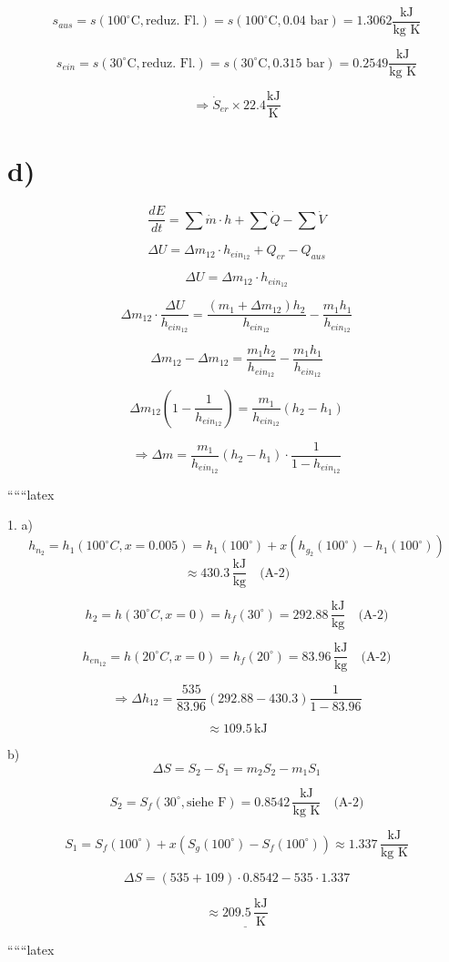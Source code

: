 \[
s_{aus} = s(100^\circ \text{C}, \text{reduz. Fl.}) = s(100^\circ \text{C}, 0.04 \text{ bar}) = 1.3062 \frac{\text{kJ}}{\text{kg K}}
\]

\[
s_{ein} = s(30^\circ \text{C}, \text{reduz. Fl.}) = s(30^\circ \text{C}, 0.315 \text{ bar}) = 0.2549 \frac{\text{kJ}}{\text{kg K}}
\]

\[
\Rightarrow \dot{S}_{er} \times 22.4 \frac{\text{kJ}}{\text{K}}
\]

\section*{d)}

\[
\frac{dE}{dt} = \sum \dot{m} \cdot h + \sum \dot{Q} - \sum \dot{V}
\]

\[
\Delta U = \Delta m_{12} \cdot h_{ein_{12}} + Q_{er} - Q_{aus}
\]

\[
\Delta U = \Delta m_{12} \cdot h_{ein_{12}}
\]

\[
\Delta m_{12} \cdot \frac{\Delta U}{h_{ein_{12}}} = \frac{(m_1 + \Delta m_{12}) h_2}{h_{ein_{12}}} - \frac{m_1 h_1}{h_{ein_{12}}}
\]

\[
\Delta m_{12} - \Delta m_{12} = \frac{m_1 h_2}{h_{ein_{12}}} - \frac{m_1 h_1}{h_{ein_{12}}}
\]

\[
\Delta m_{12} \left( 1 - \frac{1}{h_{ein_{12}}} \right) = \frac{m_1}{h_{ein_{12}}} (h_2 - h_1)
\]

\[
\Rightarrow \Delta m = \frac{m_1}{h_{ein_{12}}} (h_2 - h_1) \cdot \frac{1}{1 - h_{ein_{12}}}
\]

``````latex


1. a) 
\[
h_{n_2} = h_1(100^\circ C, x = 0.005) = h_1(100^\circ) + x \left( h_{g_2}(100^\circ) - h_1(100^\circ) \right)
\]
\[
\approx 430.3 \, \frac{\text{kJ}}{\text{kg}} \quad \text{(A-2)}
\]

\[
h_2 = h(30^\circ C, x = 0) = h_f(30^\circ) = 292.88 \, \frac{\text{kJ}}{\text{kg}} \quad \text{(A-2)}
\]

\[
h_{en_{12}} = h(20^\circ C, x = 0) = h_f(20^\circ) = 83.96 \, \frac{\text{kJ}}{\text{kg}} \quad \text{(A-2)}
\]

\[
\Rightarrow \Delta h_{12} = \frac{535}{83.96} \left( 292.88 - 430.3 \right) \frac{1}{1 - 83.96}
\]

\[
\approx 109.5 \, \text{kJ}
\]

b) 
\[
\Delta S = S_2 - S_1 = m_2 S_2 - m_1 S_1
\]

\[
S_2 = S_f(30^\circ, \text{siehe F}) = 0.8542 \, \frac{\text{kJ}}{\text{kg K}} \quad \text{(A-2)}
\]

\[
S_1 = S_f(100^\circ) + x \left( S_g(100^\circ) - S_f(100^\circ) \right) \approx 1.337 \, \frac{\text{kJ}}{\text{kg K}}
\]

\[
\Delta S = (535 + 109) \cdot 0.8542 - 535 \cdot 1.337
\]

\[
\approx \underline{209.5 \, \frac{\text{kJ}}{\text{K}}}
\]

``````latex


